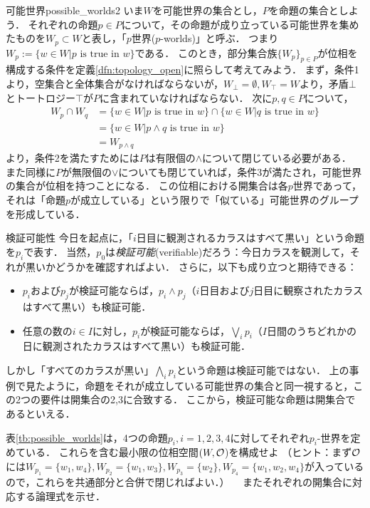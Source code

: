 \documentclass[11pt,a4paper, dvipdfmx]{jsarticle}
\begin{document}
\begin{rei}{可能世界}{possible_worlds2}
いま$W$を可能世界の集合とし，$P$を命題の集合としよう．
それぞれの命題$p \in P$について，その命題が成り立っている可能世界を集めたものを$W_p \subset W$と表し，「$p$世界($p$-worlds)」と呼ぶ．
つまり$W_p := \{ w \in W | p \text{ is true in } w \}$である．
このとき，部分集合族$\{ W_p \}_{p \in P}$が位相を構成する条件を定義\ref{dfn:topology_open}に照らして考えてみよう．
まず，条件1より，空集合と全体集合がなければならないが，$W_{\bot} = \emptyset, W_{\top}=W$より，矛盾$\bot$とトートロジー$\top$が$P$に含まれていなければならない．
次に$p, q \in P$について，
\begin{align*}
W_p \cap W_q &=  \{ w \in W | p \text{ is true in } w \} \cap \{ w \in W | q \text{ is true in } w \} \\
&= \{ w \in W | p \wedge q \text{ is true in } w \} \\
&= W_{p \wedge q}
\end{align*}
より，条件2を満たすためには$P$は有限個の$\wedge$について閉じている必要がある．
また同様に$P$が無限個の$\vee$についても閉じていれば，条件3が満たされ，可能世界の集合が位相を持つことになる．
この位相における開集合は各$p$世界であって，それは「命題$p$が成立している」という限りで「似ている」可能世界のグループを形成している．
\end{rei}

\begin{rei}{検証可能性}{}  
  今日を起点に，「$i$日目に観測されるカラスはすべて黒い」という命題を$p_i$で表す．
  当然，$p_0$は\emph{検証可能}(verifiable)だろう：今日カラスを観測して，それが黒いかどうかを確認すればよい．
  さらに，以下も成り立つと期待できる：
  \begin{itemize}
   \item $p_i$および$p_j$が検証可能ならば，$p_i \wedge p_j$（$i$日目および$j$日目に観察されたカラスはすべて黒い）も検証可能．
   \item 任意の数の$i \in I$に対し，$p_i$が検証可能ならば，$\bigvee_i p_i$（$I$日間のうちどれかの日に観測されたカラスはすべて黒い）も検証可能．
  \end{itemize}
  しかし「すべてのカラスが黒い」$\bigwedge_i p_i$という命題は検証可能ではない．
  上の事例で見たように，命題をそれが成立している可能世界の集合と同一視すると，この2つの要件は開集合の2,3に合致する．
  ここから，検証可能な命題は開集合であるといえる\citep{Kelly1996-hl,Genin2018-fr}．
  \end{rei}
  
\begin{renshu}{}{}
  表\ref{tb:possible_worlds}は，4つの命題$p_i, i = 1, 2, 3, 4$に対してそれぞれ$p_i$-世界を定めている．
  これらを含む最小限の位相空間$(W, \mathcal{O}$)を構成せよ
  （ヒント：まず$\mathcal{O}$には$W_{p_1} = \{w_1, w_4\}, W_{p_2} = \{w_1, w_3\}, W_{p_3} = \{w_2\}, W_{p_4} = \{w_1, w_2, w_4\}$が入っているので，これらを共通部分と合併で閉じればよい．）
　またそれぞれの開集合に対応する論理式を示せ．
\end{renshu}
\end{document}
